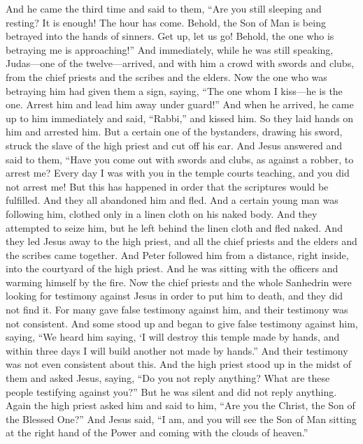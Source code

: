 \begin{biblechapter}
\verse And he came the third time and said to them, “Are you still sleeping and resting? It is enough! The hour has come. Behold, the Son of Man is being betrayed into the hands of sinners.
\verse Get up, let us go! Behold, the one who is betraying me is approaching!”
 And immediately, while he was still speaking, Judas—one of the twelve—arrived, and with him a crowd with swords and clubs, from the chief priests and the scribes and the elders.
\verse Now the one who was betraying him had given them a sign, saying, “The one whom I kiss—he is the one. Arrest him and lead him away under guard!”
\verse And when he arrived, he came up to him immediately and said, “Rabbi,” and kissed him.
\verse So they laid hands on him and arrested him.
\verse But a certain one of the bystanders, drawing his sword, struck the slave of the high priest and cut off his ear.
\verse And Jesus answered and said to them, “Have you come out with swords and clubs, as against a robber, to arrest me?
\verse Every day I was with you in the temple courts teaching, and you did not arrest me! But this has happened in order that the scriptures would be fulfilled.
\verse And they all abandoned him and fled.
\verse And a certain young man was following him, clothed only in a linen cloth on his naked body. And they attempted to seize him,
\verse but he left behind the linen cloth and fled naked.
 And they led Jesus away to the high priest, and all the chief priests and the elders and the scribes came together.
\verse And Peter followed him from a distance, right inside, into the courtyard of the high priest. And he was sitting with the officers and warming himself by the fire.
\verse Now the chief priests and the whole Sanhedrin were looking for testimony against Jesus in order to put him to death, and they did not find it.
\verse For many gave false testimony against him, and their testimony was not consistent.
\verse And some stood up and began to give false testimony against him, saying,
\verse “We heard him saying, ‘I will destroy this temple made by hands, and within three days I will build another not made by hands.”
\verse And their testimony was not even consistent about this.
\verse And the high priest stood up in the midst of them and asked Jesus, saying, “Do you not reply anything? What are these people testifying against you?”
\verse But he was silent and did not reply anything. Again the high priest asked him and said to him, “Are you the Christ, the Son of the Blessed One?”
\verse And Jesus said, “I am, and you will see the Son of Man sitting at the right hand of the Power and coming with the clouds of heaven.”

\end{biblechapter}
